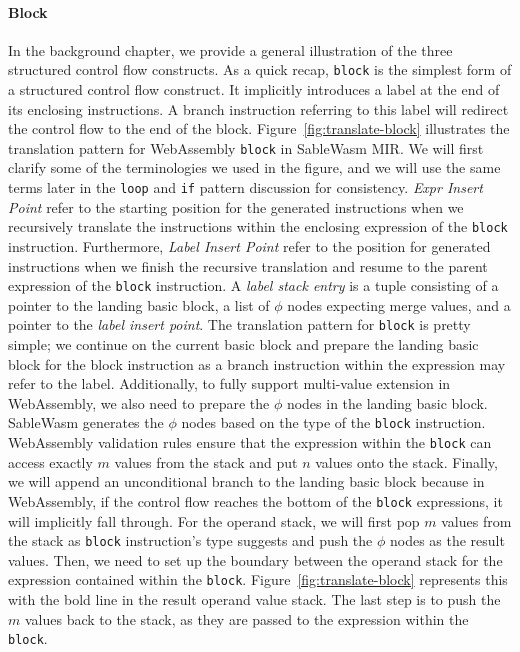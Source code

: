 \paragraph{Block}
In the background chapter, we provide a general illustration of the three
structured control flow constructs. As a quick recap, \texttt{block} is the
simplest form of a structured control flow construct. It implicitly introduces
a label at the end of its enclosing instructions. A branch instruction
referring to this label will redirect the control flow to the end of the block.
Figure~\ref{fig:translate-block} illustrates the translation pattern for
WebAssembly \texttt{block} in SableWasm MIR. We will first clarify some of the
terminologies we used in the figure, and we will use the same terms later in
the \texttt{loop} and \texttt{if} pattern discussion for consistency.
\emph{Expr Insert Point} refer to the starting position for the generated
instructions when we recursively translate the instructions within the enclosing
expression of the \texttt{block} instruction. Furthermore,
\emph{Label Insert Point} refer to the position for generated instructions when
we finish the recursive translation and resume to the parent expression of the
\texttt{block} instruction. A \emph{label stack entry} is a tuple consisting of
a pointer to the landing basic block, a list of $\phi$ nodes expecting merge
values, and a pointer to the \emph{label insert point}. The translation pattern
for \texttt{block} is pretty simple; we continue on the current basic block and
prepare the landing basic block for the block instruction as a branch
instruction within the expression may refer to the label. Additionally, to fully
support multi-value extension in WebAssembly, we also need to prepare the $\phi$
nodes in the landing basic block. SableWasm generates the $\phi$ nodes based on
the type of the \texttt{block} instruction. WebAssembly validation rules ensure
that the expression within the \texttt{block} can access exactly $m$ values from
the stack and put $n$ values onto the stack. Finally, we will append an
unconditional branch to the landing basic block because in WebAssembly,
if the control flow reaches the bottom of the \texttt{block} expressions, it
will implicitly fall through. For the operand stack, we will first pop $m$
values from the stack as \texttt{block} instruction's type suggests and push the
$\phi$ nodes as the result values. Then, we need to set up the boundary between
the operand stack for the expression contained within the \texttt{block}.
Figure~\ref{fig:translate-block} represents this with the bold line in the
result operand value stack. The last step is to push the $m$ values back to the
stack, as they are passed to the expression within the \texttt{block}.


